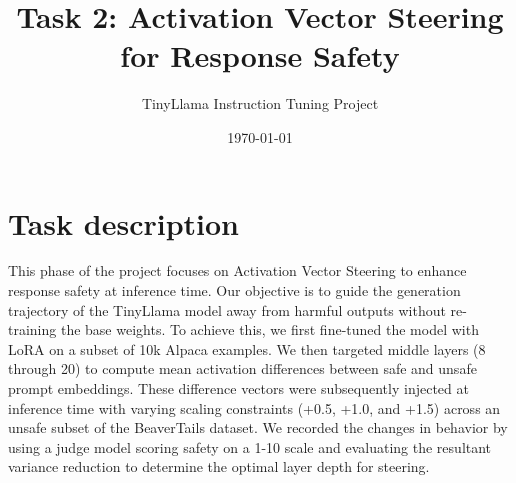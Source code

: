 \documentclass[10pt,a4paper]{article}
\title{\textbf{Task 2: Activation Vector Steering for Response Safety}}
\author{TinyLlama Instruction Tuning Project}
\date{\today}
\begin{document}
\maketitle
\vspace{-1em}

\section*{Task description}
This phase of the project focuses on Activation Vector Steering to enhance response safety at inference time. Our objective is to guide the generation trajectory of the TinyLlama model away from harmful outputs without re-training the base weights. To achieve this, we first fine-tuned the model with LoRA on a subset of 10k Alpaca examples. We then targeted middle layers (8 through 20) to compute mean activation differences between safe and unsafe prompt embeddings. These difference vectors were subsequently injected at inference time with varying scaling constraints (+0.5, +1.0, and +1.5) across an unsafe subset of the BeaverTails dataset. We recorded the changes in behavior by using a judge model scoring safety on a 1-10 scale and evaluating the resultant variance reduction to determine the optimal layer depth for steering.
\end{document}
